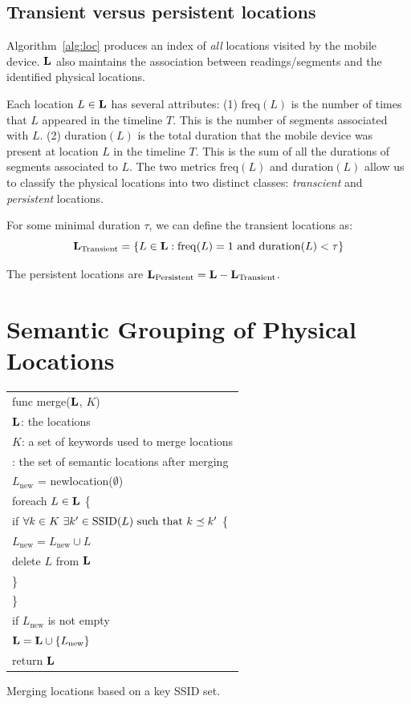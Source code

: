 \subsection{Transient versus persistent locations}

Algorithm~\ref{alg:loc} produces an index of {\em all} locations visited by the
mobile device.  $\mathbf{L}$ also maintains the association between readings/segments
and the identified physical locations.

Each location $L\in\mathbf{L}$ has several attributes:
(1) $\mathrm{freq}(L)$ is the number of times that $L$ appeared in the timeline $T$.  This is the number of segments associated with $L$.
(2) $\mathrm{duration}(L)$ is the total duration that the mobile device was present at location $L$ in the timeline $T$.  This is the sum of all the durations of segments associated to $L$.
The two metrics $\mathrm{freq}(L)$ and $\mathrm{duration}(L)$ allow us to
classify the physical locations into two distinct classes: {\em transcient} and
{\em persistent} locations.

For some minimal duration $\tau$, we can define the transient locations as:
$$\mathbf{L}_\mathrm{Transient} = \{ L\in \mathbf{L} :
    \mathrm{freq}(L) = 1\ \mathrm{and}\ \mathrm{duration}(L) < \tau
\}$$

The persistent locations are $\mathbf{L}_\mathrm{Persistent} = \mathbf{L} -
\mathbf{L}_\mathrm{Transient}$.

\section{Semantic Grouping of Physical Locations}

\begin{algorithm}[t]
    \centering
    \begin{tabular}{|l|} \hline
        func merge($\mathbf{L}$, $K$) \\
        \RRR $\mathbf{L}$: the locations \\
        \RRR $K$: a set of keywords used to merge locations \\
        \RRR {\em returns}: the set of semantic locations after merging\\ \hline
        $L_\mathrm{new}$ = newlocation($\emptyset$)\\
        foreach $L\in\mathbf{L}$ \{ \\
            \RRR if $\forall k\in K\ \exists k'\in\mathrm{SSID}(L)\ \mathrm{such\ that}\ k\preceq k'$ \{ \\
            \RRR \RRR $L_\mathrm{new} = L_\mathrm{new}\cup L$ \\
            \RRR \RRR delete $L$ from $\mathbf{L}$ \\
            \RRR \} \\
        \} \\
        if $L_\mathrm{new}$ is not empty \\
        \RRR $\mathbf{L} = \mathbf{L}\cup\{L_\mathrm{new}\}$ \\
        return $\mathbf{L}$ \\ \hline
    \end{tabular}
    \vspace{0.4cm}
    \caption{Merging locations based on a key SSID set.}
    \label{alg:merge}
\end{algorithm}

